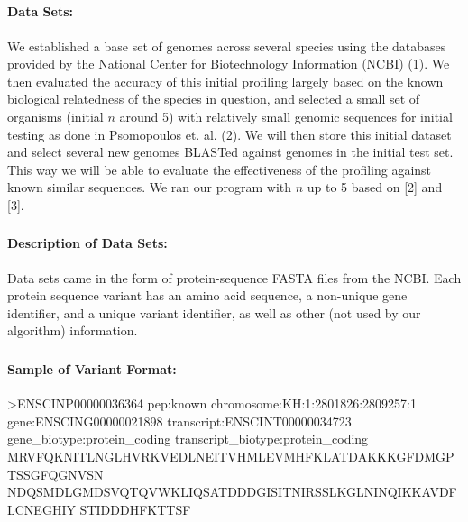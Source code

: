 \documentclass[11pt, oneside]{article}
\begin{document}
\subsection{}
\paragraph
{\bfseries Data Sets:} We established a base set of genomes across several species using the databases provided by the National Center for Biotechnology Information (NCBI) (1). We then evaluated the accuracy of this initial profiling largely based on the known biological relatedness of the species in question, and selected a small set of organisms (initial $n$ around 5) with relatively small genomic sequences for initial testing as done in Psomopoulos et. al. (2). We will then store this initial dataset and select several new genomes BLASTed against genomes in the initial test set. This way we will be able to evaluate the effectiveness of the profiling against known similar sequences. We ran our program with $n$ up to 5 based on [2] and [3].

\subsubsection{}
\paragraph
{\bfseries Description of Data Sets:} Data sets came in the form of protein-sequence FASTA files from the NCBI. Each protein sequence variant has an amino acid sequence, a non-unique gene identifier, and a unique variant identifier, as well as other (not used by our algorithm) information.

\subsubsection{}
\paragraph
{\bfseries Sample of Variant Format:}
>ENSCINP00000036364 pep:known chromosome:KH:1:2801826:2809257:1 gene:ENSCING00000021898 transcript:ENSCINT00000034723 gene\_biotype:protein\_coding transcript\_biotype:protein\_coding
MRVFQKNITLNGLHVRKVEDLNEITVHMLEVMHFKLATDAKKKGFDMGPTSSGFQGNVSN
NDQSMDLGMDSVQTQVWKLIQSATDDDGISITNIRSSLKGLNINQIKKAVDFLCNEGHIY
STIDDDHFKTTSF
\end{document}
